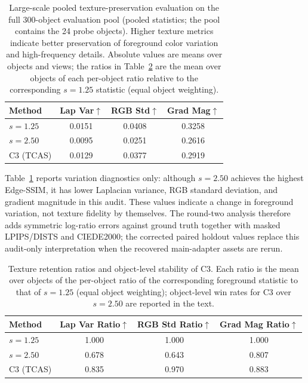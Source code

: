 \documentclass[times,twocolumn,final]{elsarticle}
\begin{document}
\begin{table}[t]
\centering
\caption{Large-scale pooled texture-preservation evaluation on the full 300-object evaluation pool (pooled statistics; the pool contains the 24 probe objects). Higher texture metrics indicate better preservation of foreground color variation and high-frequency details. Absolute values are means over objects and views; the ratios in Table~\ref{tab:retention} are the mean over objects of each per-object ratio relative to the corresponding $s = 1.25$ statistic (equal object weighting).}
\label{tab:texture300}
\small
\begin{tabular}{lccc}
\toprule
Method & Lap Var$\uparrow$ & RGB Std$\uparrow$ & Grad Mag$\uparrow$ \\
\midrule
$s = 1.25$ & 0.0151 & 0.0408 & 0.3258 \\
$s = 2.50$ & 0.0095 & 0.0251 & 0.2616 \\
C3 (TCAS) & 0.0129 & 0.0377 & 0.2919 \\
\bottomrule
\end{tabular}
\end{table}

Table~\ref{tab:texture300} reports variation diagnostics only: although $s = 2.50$ achieves the highest Edge-SSIM, it has lower Laplacian variance, RGB standard deviation, and gradient magnitude in this audit. These values indicate a change in foreground variation, not texture fidelity by themselves. The round-two analysis therefore adds symmetric log-ratio errors against ground truth together with masked LPIPS/DISTS and CIEDE2000; the corrected paired holdout values replace this audit-only interpretation when the recovered main-adapter assets are rerun.


\begin{table}[t]
\centering
\caption{Texture retention ratios and object-level stability of C3. Each ratio is the mean over objects of the per-object ratio of the corresponding foreground statistic to that of $s = 1.25$ (equal object weighting); object-level win rates for C3 over $s = 2.50$ are reported in the text.}
\label{tab:retention}
\small\setlength{\tabcolsep}{4pt}
\begin{tabular}{lccc}
\toprule
Method & Lap Var Ratio$\uparrow$ & RGB Std Ratio$\uparrow$ & Grad Mag Ratio$\uparrow$ \\
\midrule
$s = 1.25$ & 1.000 & 1.000 & 1.000 \\
$s = 2.50$ & 0.678 & 0.643 & 0.807 \\
C3 (TCAS) & 0.835 & 0.970 & 0.883 \\
\bottomrule
\end{tabular}
\end{table}
\end{document}
